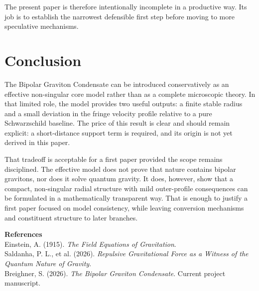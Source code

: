 \documentclass[11pt]{article}
\begin{document}
The present paper is therefore intentionally incomplete in a productive way. Its job is to establish the narrowest defensible first step before moving to more speculative mechanisms.

\section{Conclusion}
The Bipolar Graviton Condensate can be introduced conservatively as an effective non-singular core model rather than as a complete microscopic theory. In that limited role, the model provides two useful outputs: a finite stable radius and a small deviation in the fringe velocity profile relative to a pure Schwarzschild baseline. The price of this result is clear and should remain explicit: a short-distance support term is required, and its origin is not yet derived in this paper.

That tradeoff is acceptable for a first paper provided the scope remains disciplined. The effective model does not prove that nature contains bipolar gravitons, nor does it solve quantum gravity. It does, however, show that a compact, non-singular radial structure with mild outer-profile consequences can be formulated in a mathematically transparent way. That is enough to justify a first paper focused on model consistency, while leaving conversion mechanisms and constituent structure to later branches.

\vspace{1em}
\noindent\textbf{References}\\
\small
Einstein, A. (1915). \textit{The Field Equations of Gravitation}.\\
Saldanha, P. L., et al. (2026). \textit{Repulsive Gravitational Force as a Witness of the Quantum Nature of Gravity}.\\
Breighner, S. (2026). \textit{The Bipolar Graviton Condensate}. Current project manuscript.
\end{document}
